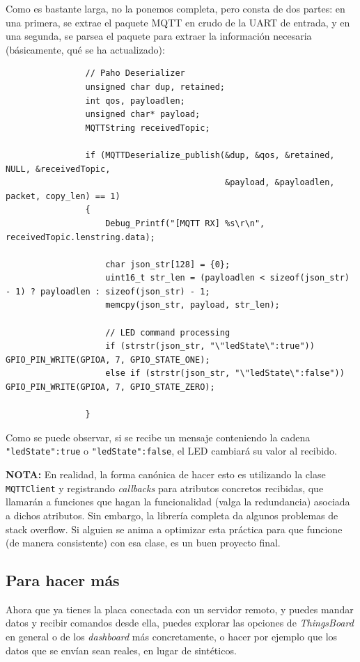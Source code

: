 \documentclass[../main.tex]{subfiles}
\begin{document}
            Como es bastante larga, no la ponemos completa, pero consta de dos partes: en una primera, se extrae el paquete MQTT en crudo de la UART de entrada, y en una segunda, se parsea el paquete para extraer la información necesaria (básicamente, qué se ha actualizado):

            \begin{lstlisting}
                // Paho Deserializer
                unsigned char dup, retained;
                int qos, payloadlen;
                unsigned char* payload;
                MQTTString receivedTopic;

                if (MQTTDeserialize_publish(&dup, &qos, &retained, NULL, &receivedTopic,
                                            &payload, &payloadlen, packet, copy_len) == 1)
                {
                    Debug_Printf("[MQTT RX] %s\r\n", receivedTopic.lenstring.data);

                    char json_str[128] = {0};
                    uint16_t str_len = (payloadlen < sizeof(json_str) - 1) ? payloadlen : sizeof(json_str) - 1;
                    memcpy(json_str, payload, str_len);

                    // LED command processing
                    if (strstr(json_str, "\"ledState\":true"))        GPIO_PIN_WRITE(GPIOA, 7, GPIO_STATE_ONE);
                    else if (strstr(json_str, "\"ledState\":false"))   GPIO_PIN_WRITE(GPIOA, 7, GPIO_STATE_ZERO);

                }
            \end{lstlisting}

            Como se puede observar, si se recibe un mensaje conteniendo la cadena \texttt{"ledState":true} o \texttt{"ledState":false}, el LED cambiará su valor al recibido.

            \textbf{NOTA:} En realidad, la forma canónica de hacer esto es utilizando la clase \texttt{MQTTClient} y registrando \emph{callbacks} para atributos concretos recibidas, que llamarán a funciones que hagan la funcionalidad (valga la redundancia) asociada a dichos atributos. Sin embargo, la librería completa da algunos problemas de stack overflow. Si alguien se anima a optimizar esta práctica para que funcione (de manera consistente) con esa clase, es un buen proyecto final.


    \subsection{Para hacer más}

        Ahora que ya tienes la placa conectada con un servidor remoto, y puedes mandar datos y recibir comandos desde ella, puedes explorar las opciones de \emph{ThingsBoard} en general o de los \emph{dashboard} más concretamente, o hacer por ejemplo que los datos que se envían sean reales, en lugar de sintéticos. 
\end{document}
